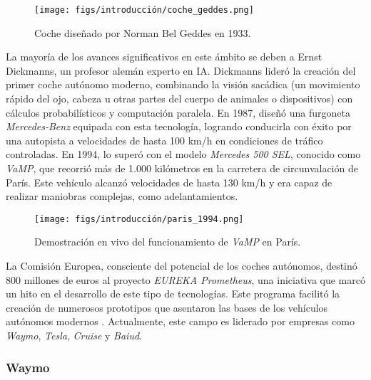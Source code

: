 \begin{figure} [ht]
\begin{center}
\texttt{[image: figs/introducción/coche\_geddes.png]}
\end{center}
\caption{Coche diseñado por Norman Bel Geddes en 1933.}
\label{fig:coche-geddes}
\end{figure}

La mayoría de los avances significativos en este ámbito se deben a Ernst Dickmanns, un profesor alemán experto en \ac{IA}. Dickmanns lideró la creación del primer coche autónomo moderno, combinando la visión sacádica (un movimiento
rápido del ojo, cabeza u otras partes del cuerpo de animales o dispositivos) con cálculos probabilísticos y computación paralela. En 1987, diseñó una furgoneta \textit{Mercedes-Benz} equipada con esta tecnología, logrando conducirla con éxito por una autopista a velocidades de hasta 100 km/h en condiciones de tráfico controladas. En 1994, lo superó con el modelo \textit{Mercedes 500 SEL}, conocido como \textit{VaMP}, que recorrió más de 1.000 kilómetros en la carretera de circunvalación de París. Este vehículo alcanzó velocidades de hasta 130 km/h y era capaz de realizar maniobras complejas, como adelantamientos.

\begin{figure}[ht]
\begin{center}
\texttt{[image: figs/introducción/paris\_1994.png]}
\end{center}
\caption{Demostración en vivo del funcionamiento de \textit{VaMP} en París.}
\label{fig:vamp}
\end{figure}

La Comisión Europea, consciente del potencial de los coches autónomos, destinó 800 millones de euros al proyecto \textit{EUREKA Prometheus}, una iniciativa que marcó un hito en el desarrollo de este tipo de tecnologías. Este programa facilitó la creación de numerosos prototipos que asentaron las bases de los vehículos autónomos modernos \cite{history-vehicles}. Actualmente, este campo es liderado por empresas como \textit{Waymo}, \textit{Tesla}, \textit{Cruise} y \textit{Baiud}.

\subsubsection{Waymo}

